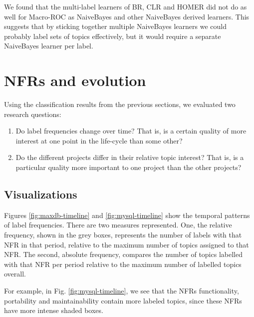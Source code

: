 \documentclass[]{sig-alternate}
\begin{document}
We found that the multi-label learners of BR, CLR and HOMER did not do as well for Macro-ROC as NaiveBayes and other NaiveBayes derived learners. This suggests that by sticking together multiple NaiveBayes learners we could probably label sets of topics effectively, but it would require a separate NaiveBayes learner per label.

\section{NFRs and evolution} 
Using the classification results from the previous sections, we evaluated two research questions:
\begin{enumerate}
\item Do label frequencies change over time? That is, is a certain quality of more interest at one point in the life-cycle than some other? 
\item  Do the different projects differ in their relative topic interest? That is, is a particular quality more important to one project than the other projects?  
\end{enumerate}


\subsection{Visualizations}
Figures \ref{fig:maxdb-timeline} and \ref{fig:mysql-timeline} show the temporal patterns of label frequencies. There are two measures represented. One, the relative frequency, shown in the grey boxes, represents the number of labels with that NFR in that period, relative to the maximum number of topics assigned to that NFR. The second, absolute frequency, compares the number of topics labelled with that NFR per period relative to the maximum number of labelled topics overall. 

For example, in Fig. \ref{fig:mysql-timeline}, we see that the NFRs functionality, portability and maintainability contain more labeled topics, since these NFRs have more intense shaded boxes. 


\end{document}
